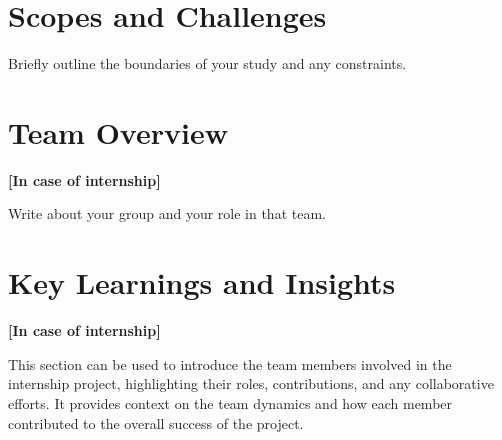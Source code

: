 \section{Scopes and Challenges}
Briefly outline the boundaries of your study and any constraints.

\section{Team Overview}
\textbf{[In case of internship]}

Write about your group and your role in that team.

\section{Key Learnings and Insights}
\textbf{[In case of internship]}

This section can be used to introduce the team members involved in the internship project, highlighting their roles, contributions, and any collaborative efforts. It provides context on the team dynamics and how each member contributed to the overall success of the project.




